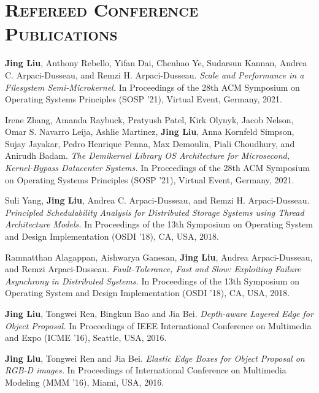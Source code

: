 \documentclass[10pt, letterpaper]{article}
\begin{document}
\section*{\textsc{Refereed Conference Publications}}

\begin{enumerate}[fullwidth,itemindent=1.1em,label={[\arabic*]}]
    \item {\bf Jing Liu}, Anthony Rebello, Yifan Dai, Chenhao Ye, Sudarsun Kannan, Andrea C. Arpaci-Dusseau, and Remzi H. Arpaci-Dusseau. \textit{Scale and Performance in a Filesystem Semi-Microkernel.} In Proceedings of the 28th ACM Symposium on Operating Systems Principles (SOSP '21), Virtual Event, Germany, 2021.    
    \item Irene Zhang, Amanda Raybuck, Pratyush Patel, Kirk Olynyk, Jacob Nelson, Omar S. Navarro Leija, Ashlie Martinez, {\bf Jing Liu}, Anna Kornfeld Simpson, Sujay Jayakar, Pedro Henrique Penna, Max Demoulin, Piali Choudhury, and Anirudh Badam. \textit{The Demikernel Library OS Architecture for Microsecond, Kernel-Bypass Datacenter Systems.} In Proceedings of the 28th ACM Symposium on Operating Systems Principles (SOSP '21), Virtual Event, Germany, 2021.
	\item Suli Yang, {\bf Jing Liu}, Andrea C. Arpaci-Dusseau, and Remzi H. Arpaci-Dusseau. \textit{Principled Schedulability Analysis for Distributed Storage Systems using Thread Architecture Models.}
        In Proceedings of the 13th Symposium on Operating System and Design Implementation (OSDI '18), CA, USA, 2018.
    \item Ramnatthan Alagappan, Aishwarya Ganesan, {\bf Jing Liu}, Andrea Arpaci-Dusseau, and Remzi Arpaci-Dusseau. \textit{Fault-Tolerance, Fast and Slow: Exploiting Failure Asynchrony in Distributed Systems.}
        In Proceedings of the 13th Symposium on Operating System and Design Implementation (OSDI '18), CA, USA, 2018.
    \item {\bf Jing Liu}, Tongwei Ren, Bingkun Bao and Jia Bei. \textit{Depth-aware Layered Edge for Object  Proposal.}
		In Proceedings of IEEE International Conference on Multimedia and  Expo (ICME '16), Seattle, USA, 2016.
	\item {\bf Jing Liu}, Tongwei Ren and Jia Bei. \textit{Elastic Edge Boxes for Object Proposal on RGB-D images.} 
 		In Proceedings of International Conference on Multimedia Modeling (MMM '16), Miami, USA, 2016.

\end{enumerate}
\end{document}
